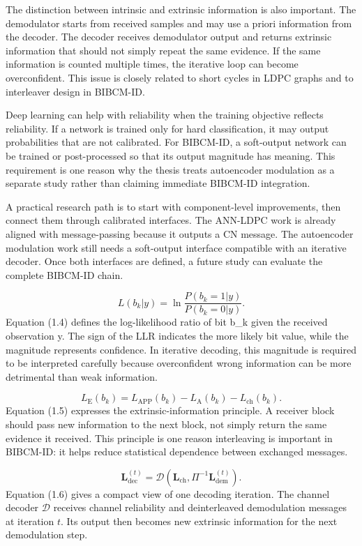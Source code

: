 The distinction between intrinsic and extrinsic information is also important. The demodulator starts from received samples and may use a priori information from the decoder. The decoder receives demodulator output and returns extrinsic information that should not simply repeat the same evidence. If the same information is counted multiple times, the iterative loop can become overconfident. This issue is closely related to short cycles in LDPC graphs and to interleaver design in BIBCM-ID.

Deep learning can help with reliability when the training objective reflects reliability. If a network is trained only for hard classification, it may output probabilities that are not calibrated. For BIBCM-ID, a soft-output network can be trained or post-processed so that its output magnitude has meaning. This requirement is one reason why the thesis treats autoencoder modulation as a separate study rather than claiming immediate BIBCM-ID integration.

A practical research path is to start with component-level improvements, then connect them through calibrated interfaces. The ANN-LDPC work is already aligned with message-passing because it outputs a CN message. The autoencoder modulation work still needs a soft-output interface compatible with an iterative decoder. Once both interfaces are defined, a future study can evaluate the complete BIBCM-ID chain.

\begin{equation}
L(b_k|y)=\ln\frac{P(b_k=1|y)}{P(b_k=0|y)}.
\end{equation}
Equation (1.4) defines the log-likelihood ratio of bit b\_k given the received observation y. The sign of the LLR indicates the more likely bit value, while the magnitude represents confidence. In iterative decoding, this magnitude is required to be interpreted carefully because overconfident wrong information can be more detrimental than weak information.

\begin{equation}
L_{\mathrm{E}}(b_k)=L_{\mathrm{APP}}(b_k)-L_{\mathrm{A}}(b_k)-L_{\mathrm{ch}}(b_k).
\end{equation}
Equation (1.5) expresses the extrinsic-information principle. A receiver block should pass new information to the next block, not simply return the same evidence it received. This principle is one reason interleaving is important in BIBCM-ID: it helps reduce statistical dependence between exchanged messages.

\begin{equation}
\mathbf{L}^{(t)}_{\mathrm{dec}}=
\mathcal{D}\!\left(\mathbf{L}_{\mathrm{ch}},\Pi^{-1}\mathbf{L}^{(t)}_{\mathrm{dem}}\right).
\end{equation}
Equation (1.6) gives a compact view of one decoding iteration. The channel decoder $\mathcal{D}$ receives channel reliability and deinterleaved demodulation messages at iteration $t$. Its output then becomes new extrinsic information for the next demodulation step.

